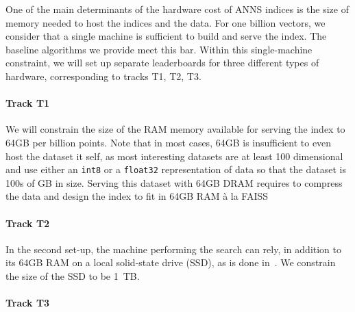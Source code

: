 One of the main determinants of the hardware cost of ANNS indices is
the size of memory needed to host the indices and the data.  For one
billion vectors, we consider that a single machine is sufficient to
build and serve the index. The baseline algorithms we provide meet
this bar.  Within this single-machine constraint, we will set up
separate leaderboards for three different types of hardware,
corresponding to tracks T1, T2, T3.

\paragraph{Track T1}

We will constrain the size of the RAM memory available for serving the
index to 64GB per billion points. Note that in most cases, 64GB is
insufficient to even host the dataset it self, as most interesting
datasets are at least 100 dimensional and use either an {\tt int8} or
a {\tt float32} representation of data so that the dataset is 100s of
GB in size.  Serving this dataset with 64GB DRAM requires to compress
the data and design the index to fit in 64GB RAM \`a la
FAISS~\cite{Faiss17}

\paragraph{Track T2}

In the second set-up, the machine performing the search can rely, in addition to its 64GB RAM on a local 
solid-state drive (SSD), as is done in~\cite{DiskANN19}. 
We constrain the size of the SSD to be 1~TB. 


\paragraph{Track T3}

